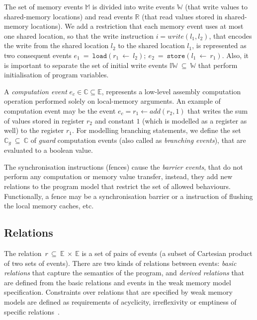 The set of memory events $\mathbb{M}$ is divided into write events $\mathbb{W}$ (that write values to shared-memory locations) and read events $\mathbb{R}$ (that read values stored in shared-memory locations).
We add a restriction that each memory event uses at most one shared location, so that the write instruction $i = write(l_1, l_2)$, that encodes the write from the shared location $l_2$ to the shared location $l_1$, is represented as two consequent events $e_1~=~\texttt{load}(r_1~\leftarrow~l_2); \ e_2~=~\texttt{store}(l_1~\leftarrow~r_1)$.
Also, it is important to separate the set of initial write events $\mathbb{IW}~\subseteq~\mathbb{W}$ that perform initialisation of program variables.

A \textit{computation event} $e_c \in \mathbb{C} \subseteq \mathbb{E}$, represents a low-level assembly computation operation performed solely on local-memory arguments.
An example of computation event may be the event $e_c = r_1 \leftarrow add(r_2, 1)$ that writes the sum of values stored in register $r_2$ and constant $1$ (which is modelled as a register as well) to the register $r_1$.
For modelling branching statements, we define the set $\mathbb{C}_{g}~\subseteq~\mathbb{C}$ of \textit{guard} computation events (also called as \textit{branching events}), that are evaluated to a boolean value.

The synchronisation instructions (fences) cause the \textit{barrier events}, that do not perform any computation or memory value transfer, instead, they add new relations to the program model that restrict the set of allowed behaviours.
Functionally, a fence may be a synchronisation barrier or a instruction of flushing the local memory caches, etc.


\subsection{Relations}
\label{ch:wmm:model:relations}


The relation~$r\,\subseteq~\mathbb{E}~\times~\mathbb{E}$ is a set of pairs of events (a subset of Cartesian product of two sets of events). There are two kinds of relations between events: \textit{basic relations} that capture the semantics of the program, and \textit{derived relations} that are defined from the basic relations and events in the weak memory model specification. Constraints over relations that are specified by weak memory models are defined as requirements of acyclicity, irreflexivity or emptiness of specific relations~\cite{alglave2016syntax}.

